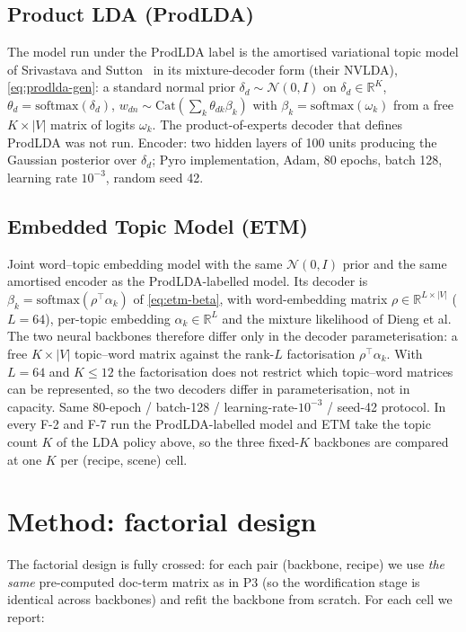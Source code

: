 \documentclass[journal,a4paper,10pt]{IEEEtran}
\begin{document}
\subsection{Product LDA (ProdLDA)}
The model run under the ProdLDA label is the amortised variational
topic model of Srivastava and Sutton~\cite{srivastava2017autoencoding}
in its mixture-decoder form (their NVLDA), \eqref{eq:prodlda-gen}: a
standard normal prior $\delta_d \sim \mathcal{N}(0, I)$ on
$\delta_d \in \mathbb{R}^K$, $\theta_d = \mathrm{softmax}(\delta_d)$,
$w_{dn} \sim \mathrm{Cat}(\sum_k \theta_{dk} \beta_k)$ with
$\beta_k = \mathrm{softmax}(\omega_k)$ from a free $K \times |V|$ matrix
of logits $\omega_k$. The product-of-experts decoder that defines ProdLDA was not
run. Encoder: two hidden layers of 100 units producing the Gaussian
posterior over $\delta_d$; Pyro implementation, Adam, 80 epochs, batch
128, learning rate $10^{-3}$, random seed 42.

\subsection{Embedded Topic Model (ETM)}
Joint word--topic embedding model \cite{dieng2020topic} with the same
$\mathcal{N}(0, I)$ prior and the same amortised encoder as the
ProdLDA-labelled model. Its decoder is
$\beta_k = \mathrm{softmax}(\rho^\top \alpha_k)$ of
\eqref{eq:etm-beta}, with word-embedding matrix
$\rho \in \mathbb{R}^{L\times|V|}$ ($L = 64$), per-topic embedding
$\alpha_k \in \mathbb{R}^{L}$ and the mixture likelihood of Dieng et
al. The two neural backbones therefore differ only in the decoder
parameterisation: a free $K \times |V|$ topic--word matrix against the
rank-$L$ factorisation $\rho^\top \alpha_k$. With $L = 64$ and
$K \le 12$ the factorisation does not restrict which topic--word
matrices can be represented, so the two decoders differ in
parameterisation, not in capacity. Same 80-epoch / batch-128
/ learning-rate-$10^{-3}$ / seed-42 protocol. In every F-2 and F-7 run
the ProdLDA-labelled model and ETM take the topic count $K$ of the LDA
policy above, so the three fixed-$K$ backbones are compared at one $K$
per (recipe, scene) cell.

\section{Method: factorial design}\label{sec:method}

The factorial design is fully crossed: for each pair (backbone, recipe)
we use \emph{the same} pre-computed doc-term matrix as in P3 (so the
wordification stage is identical across backbones) and refit the
backbone from scratch. For each cell we report:
\end{document}

